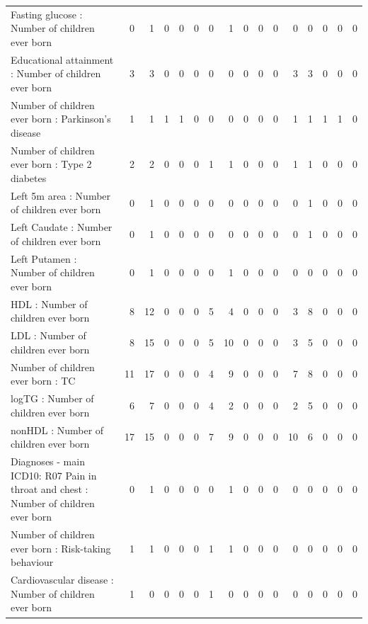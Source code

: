 \begin{table}[ht]
\begin{tabular}{lrrrrrrrrrrrrrrr}
  Fasting glucose : Number of children ever born  &   0 &   1 &   0 &   0 &   0 &   0 &   1 &   0 &   0 &   0 &   0 &   0 &   0 &   0 &   0 \\ 
  Educational attainment : Number of children ever born  &   3 &   3 &   0 &   0 &   0 &   0 &   0 &   0 &   0 &   0 &   3 &   3 &   0 &   0 &   0 \\ 
  Number of children ever born  : Parkinson's disease &   1 &   1 &   1 &   1 &   0 &   0 &   0 &   0 &   0 &   0 &   1 &   1 &   1 &   1 &   0 \\ 
  Number of children ever born  : Type 2 diabetes &   2 &   2 &   0 &   0 &   0 &   1 &   1 &   0 &   0 &   0 &   1 &   1 &   0 &   0 &   0 \\ 
  Left 5m area : Number of children ever born  &   0 &   1 &   0 &   0 &   0 &   0 &   0 &   0 &   0 &   0 &   0 &   1 &   0 &   0 &   0 \\ 
  Left Caudate : Number of children ever born  &   0 &   1 &   0 &   0 &   0 &   0 &   0 &   0 &   0 &   0 &   0 &   1 &   0 &   0 &   0 \\ 
  Left Putamen : Number of children ever born  &   0 &   1 &   0 &   0 &   0 &   0 &   1 &   0 &   0 &   0 &   0 &   0 &   0 &   0 &   0 \\ 
  HDL : Number of children ever born  &   8 &  12 &   0 &   0 &   0 &   5 &   4 &   0 &   0 &   0 &   3 &   8 &   0 &   0 &   0 \\ 
  LDL : Number of children ever born  &   8 &  15 &   0 &   0 &   0 &   5 &  10 &   0 &   0 &   0 &   3 &   5 &   0 &   0 &   0 \\ 
  Number of children ever born  : TC &  11 &  17 &   0 &   0 &   0 &   4 &   9 &   0 &   0 &   0 &   7 &   8 &   0 &   0 &   0 \\ 
  logTG : Number of children ever born  &   6 &   7 &   0 &   0 &   0 &   4 &   2 &   0 &   0 &   0 &   2 &   5 &   0 &   0 &   0 \\ 
  nonHDL : Number of children ever born  &  17 &  15 &   0 &   0 &   0 &   7 &   9 &   0 &   0 &   0 &  10 &   6 &   0 &   0 &   0 \\ 
  Diagnoses - main ICD10: R07 Pain in throat and chest : Number of children ever born  &   0 &   1 &   0 &   0 &   0 &   0 &   1 &   0 &   0 &   0 &   0 &   0 &   0 &   0 &   0 \\ 
  Number of children ever born  : Risk-taking behaviour &   1 &   1 &   0 &   0 &   0 &   1 &   1 &   0 &   0 &   0 &   0 &   0 &   0 &   0 &   0 \\ 
  Cardiovascular disease : Number of children ever born  &   1 &   0 &   0 &   0 &   0 &   1 &   0 &   0 &   0 &   0 &   0 &   0 &   0 &   0 &   0 \\ 

\end{tabular}
\end{table}

